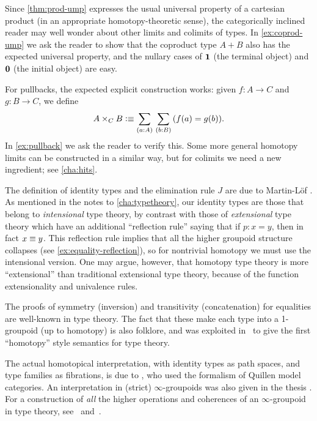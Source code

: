 %
%
Since \autoref{thm:prod-ump} expresses the usual universal property of a cartesian product (in an appropriate homotopy-theoretic sense), the categorically inclined reader may well wonder about other limits and colimits of types.
In \autoref{ex:coprod-ump} we ask the reader to show that the coproduct type $A+B$ also has the expected universal property, and the nullary cases of $\mathbf{1}$ (the terminal object) and $\mathbf{0}$ (the initial object) are easy.
%
%
%
%

%
For pullbacks, the expected explicit construction works: given $f:A\to C$ and $g:B\to C$, we define
\begin{equation}
  A\times_C B \defeq \sm{a:A}{b:B} (f(a)=g(b)).\label{eq:defn-pullback}
\end{equation}
In \autoref{ex:pullback} we ask the reader to verify this.
Some more general homotopy limits can be constructed in a similar way, but for colimits we need a new ingredient; see \autoref{cha:hits}.

%

\sectionNotes

The definition of identity types and the elimination rule $J$ are due to Martin-L\"of \cite{Martin-Lof-1972}.
As mentioned in the notes to \autoref{cha:typetheory}, our identity types are those that belong to \emph{intensional} type theory, by contrast with those of \emph{extensional} type theory which have an additional ``reflection rule'' saying that if $p:x=y$, then in fact $x\equiv y$.
This reflection rule implies that all the higher groupoid structure collapses (see \autoref{ex:equality-reflection}), so for nontrivial homotopy we must use the intensional version. 
One may argue, however, that homotopy type theory is more ``extensional'' than traditional extensional type theory, because of the function extensionality and univalence rules.  

The proofs of symmetry (inversion) and transitivity (concatenation) for equalities are well-known in type theory.
The fact that these make each type into a 1-groupoid (up to homotopy) is also folklore, and was exploited in~\cite{hs:gpd-typethy} to give the first ``homotopy'' style semantics for type theory.  

The actual homotopical interpretation, with identity types as path spaces, and type families as fibrations, is due to \cite{AW}, who used the formalism of Quillen model categories.  An interpretation in (strict) $\infty$-groupoids was also given in the thesis \cite{mw:thesis}.
For a construction of \emph{all} the higher operations and coherences of an $\infty$-groupoid in type theory, see~\cite{pll:wkom-type} and~\cite{bg:type-wkom}.

